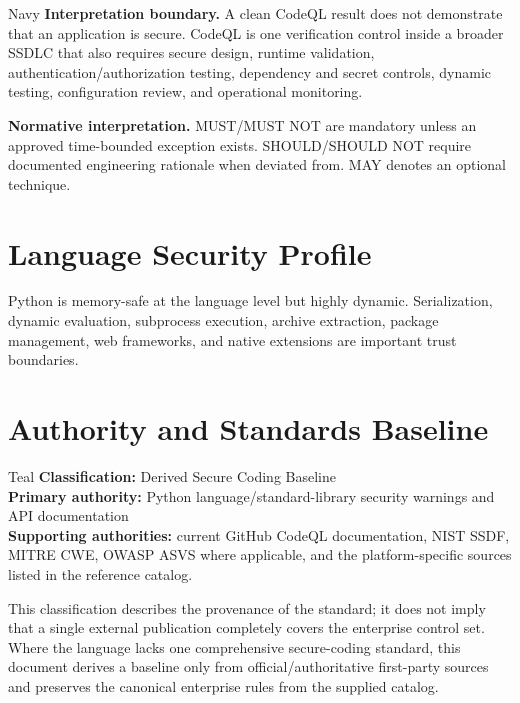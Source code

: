 \documentclass[10pt,letterpaper]{article}
\begin{document}
\begin{callout}{Navy}
\textbf{Interpretation boundary.} A clean CodeQL result does not demonstrate that an application is secure. CodeQL is one verification control inside a broader SSDLC that also requires secure design, runtime validation, authentication/authorization testing, dependency and secret controls, dynamic testing, configuration review, and operational monitoring.
\end{callout}

\textbf{Normative interpretation.} MUST/MUST NOT are mandatory unless an approved time-bounded exception exists. SHOULD/SHOULD NOT require documented engineering rationale when deviated from. MAY denotes an optional technique.

\section{Language Security Profile}
Python is memory-safe at the language level but highly dynamic. Serialization, dynamic evaluation, subprocess execution, archive extraction, package management, web frameworks, and native extensions are important trust boundaries.
\section{Authority and Standards Baseline}
\begin{callout}{Teal}
\textbf{Classification:} Derived Secure Coding Baseline\\
\textbf{Primary authority:} Python language/standard-library security warnings and API documentation\\
\textbf{Supporting authorities:} current GitHub CodeQL documentation, NIST SSDF, MITRE CWE, OWASP ASVS where applicable, and the platform-specific sources listed in the reference catalog.
\end{callout}
This classification describes the provenance of the standard; it does not imply that a single external publication completely covers the enterprise control set. Where the language lacks one comprehensive secure-coding standard, this document derives a baseline only from official/authoritative first-party sources and preserves the canonical enterprise rules from the supplied catalog.
\end{document}
